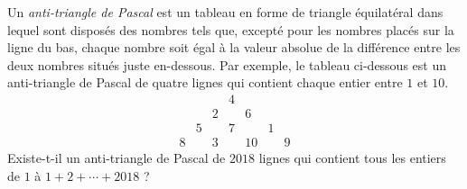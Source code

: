 Un \emph{anti-triangle de Pascal} est un tableau en forme de triangle équilatéral dans lequel sont disposés des
nombres tels que, excepté pour les nombres placés sur la ligne du bas, chaque nombre soit égal à la valeur
absolue de la différence entre les deux nombres situés juste en-dessous. Par exemple, le tableau ci-dessous est
un anti-triangle de Pascal de quatre lignes qui contient chaque entier entre $1$ et $10$.
\[
\begin{array}{ccccccc}
 & & & 4 & & & \\
 & & 2 & & 6 & & \\
 & 5 & & 7 & & 1 & \\
8 & & 3 & & 10 & & 9
\end{array}
\]
Existe-t-il un anti-triangle de Pascal de $2018$ lignes qui contient tous les entiers de $1$ à
$1 + 2 + \cdots + 2018$ ?
